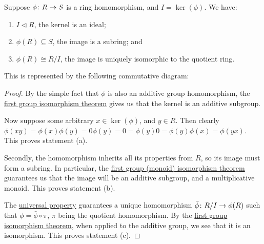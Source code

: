\begin{theorem}\label{thm:iso-1-ring}
    Suppose \(\phi\colon R\to S\) is a ring homomorphism,
    and \(I = \ker(\phi)\).
    We have:
    \begin{enumerate}[label={(\alph*)}, itemsep=0mm]
        \item \(I \lhd R\), the kernel is an ideal;
        \item \(\phi(R) \subseteq S\), the image is a subring; and
        \item \(\phi(R) \cong R/I\),
            the image is uniquely isomorphic to the quotient ring.
    \end{enumerate}

    This is represented by the following commutative diagram:
    \begin{center}
    \end{center}
\end{theorem}
\begin{proof}
    By the simple fact that \(\phi\) is also an additive group homomorphism,
    the \hyperref[thm:iso-1-group]{first group isomorphism theorem}
    gives us that the kernel is an additive subgroup.

    Now suppose some arbitrary \(x \in \ker(\phi)\), and \(y \in R\).
    Then clearly \(\phi(xy) = \phi(x)\phi(y) = 0\phi(y) = 0= 
    \phi(y)0 = \phi(y)\phi(x) = \phi(yx)\).
    This proves statement (a).

    \medskip

    Secondly, the homomorphism inherits all its properties from \(R\),
    so its image must form a subring.
    In particular,
    the \hyperref[thm:iso-1-group]{first group (monoid) isomorphism theorem}
    guarantees us that the image will be an additive subgroup,
    and a multiplicative monoid.
    This proves statement (b).

    \medskip

    The \hyperref[thm:univ-prop-quotient-ring]{universal property}
    guarantees a unique homomorphism \(\bar{\phi}\colon R/I\to\phi(R)\)
    such that \(\phi = \bar{\phi}\circ\pi\),
    \(\pi\) being the quotient homomorphism.
    By the \hyperref[thm:iso-1-group]{first group isomorphism theorem},
    when applied to the additive group,
    we see that it is an isomorphism.
    This proves statement (c).
\end{proof}

